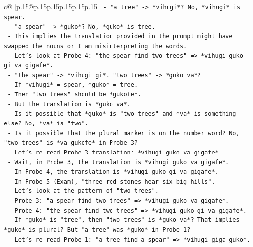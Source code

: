 \documentclass{article}
\begin{document}
{\begin{supertabular}{c@{$\;$}|p{.15\linewidth}@{}p{.15\linewidth}p{.15\linewidth}p{.15\linewidth}p{.15\linewidth}p{.15\linewidth}}
{{{\texttt{                    {-} "a tree" {-}> *vihugi*? No, *vihugi* is spear.} \\
\texttt{                    {-} "a spear" {-}> *guko*? No, *guko* is tree.} \\
\texttt{                    {-} This implies the translation provided in the prompt might have swapped the nouns or I am misinterpreting the words.} \\
\texttt{                    {-} Let's look at Probe 4: "the spear find two trees" => *vihugi guko gi va gigafe*.} \\
\texttt{                      {-} "the spear" {-}> *vihugi gi*. "two trees" {-}> *guko va*?} \\
\texttt{                      {-} If *vihugi* = spear, *guko* = tree.} \\
\texttt{                      {-} Then "two trees" should be *gukofe*.} \\
\texttt{                      {-} But the translation is *guko va*.} \\
\texttt{                      {-} Is it possible that *guko* is "two trees" and *va* is something else? No, *va* is "two".} \\
\texttt{                      {-} Is it possible that the plural marker is on the number word? No, "two trees" is *va gukofe* in Probe 3?} \\
\texttt{                      {-} Let's re{-}read Probe 3 translation: *vihugi guko va gigafe*.} \\
\texttt{                      {-} Wait, in Probe 3, the translation is *vihugi guko va gigafe*.} \\
\texttt{                      {-} In Probe 4, the translation is *vihugi guko gi va gigafe*.} \\
\texttt{                      {-} In Probe 5 (Exam), "three red stones hear six big hills".} \\
\texttt{                      {-} Let's look at the pattern of "two trees".} \\
\texttt{                      {-} Probe 3: "a spear find two trees" => *vihugi guko va gigafe*.} \\
\texttt{                      {-} Probe 4: "the spear find two trees" => *vihugi guko gi va gigafe*.} \\
\texttt{                      {-} If *guko* is "tree", then "two trees" is *guko va*? That implies *guko* is plural? But "a tree" was *guko* in Probe 1?} \\
\texttt{                      {-} Let's re{-}read Probe 1: "a tree find a spear" => *vihugi giga guko*.} \\
}}}
\end{supertabular}}
\end{document}
